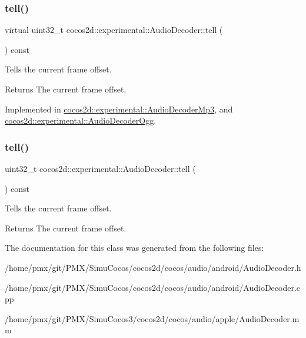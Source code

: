 \subsubsection{\texorpdfstring{tell()}{tell()}\hspace{0.1cm}{\footnotesize\ttfamily [1/2]}}
{\footnotesize\ttfamily virtual uint32\+\_\+t cocos2d\+::experimental\+::\+Audio\+Decoder\+::tell (\begin{DoxyParamCaption}{ }\end{DoxyParamCaption}) const\hspace{0.3cm}{\ttfamily [pure virtual]}}



Tells the current frame offset. 

\begin{DoxyReturn}{Returns}
The current frame offset. 
\end{DoxyReturn}


Implemented in \hyperlink{classcocos2d_1_1experimental_1_1AudioDecoderMp3_adf8e9914377f0cca2fa45a5741bb20bf}{cocos2d\+::experimental\+::\+Audio\+Decoder\+Mp3}, and \hyperlink{classcocos2d_1_1experimental_1_1AudioDecoderOgg_a4b0c16bf9b5f4ca1fda2752a353b836a}{cocos2d\+::experimental\+::\+Audio\+Decoder\+Ogg}.

\mbox{\label{classcocos2d_1_1experimental_1_1AudioDecoder_a7a9f425aa4e62390e404134f19b1bdaf}} 
\subsubsection{\texorpdfstring{tell()}{tell()}\hspace{0.1cm}{\footnotesize\ttfamily [2/2]}}
{\footnotesize\ttfamily uint32\+\_\+t cocos2d\+::experimental\+::\+Audio\+Decoder\+::tell (\begin{DoxyParamCaption}{ }\end{DoxyParamCaption}) const}



Tells the current frame offset. 

\begin{DoxyReturn}{Returns}
The current frame offset. 
\end{DoxyReturn}


The documentation for this class was generated from the following files\+:\begin{DoxyCompactItemize}
\item 
/home/pmx/git/\+P\+M\+X/\+Simu\+Cocos/cocos2d/cocos/audio/android/Audio\+Decoder.\+h\item 
/home/pmx/git/\+P\+M\+X/\+Simu\+Cocos/cocos2d/cocos/audio/android/Audio\+Decoder.\+cpp\item 
/home/pmx/git/\+P\+M\+X/\+Simu\+Cocos3/cocos2d/cocos/audio/apple/Audio\+Decoder.\+mm\end{DoxyCompactItemize}
